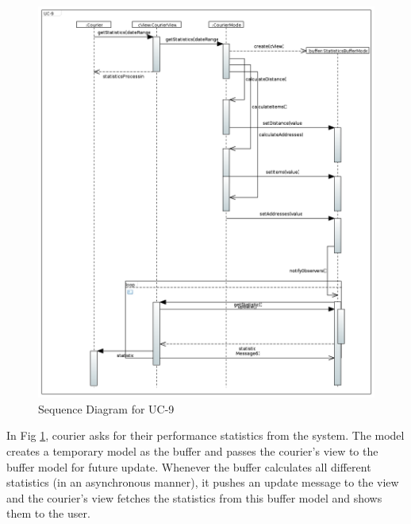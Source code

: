 \begin{figure}[h!]
\begin{center}
\includegraphics[scale=0.35]{FIGS/UC-91.PNG}
    \caption{Sequence Diagram for UC-9}
    \label{fig:seq_diag9}
\end{center}
\end{figure}

In Fig \ref{fig:seq_diag9}, courier asks for their performance statistics from the system. The model creates a temporary model as the buffer and passes the courier's view to the buffer model for future update. Whenever the buffer calculates all different statistics (in an asynchronous manner), it pushes an update message to the view and the courier's view fetches the statistics from this buffer model and shows them to the user.
